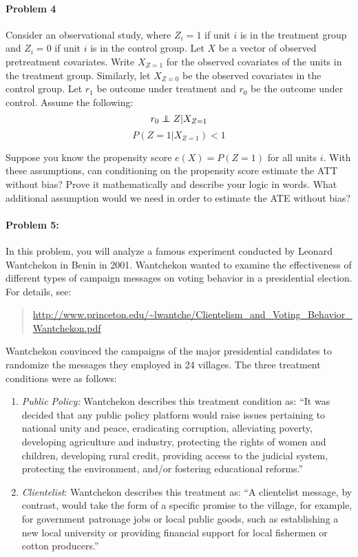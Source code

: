 \documentclass{article}
\newcommand\independent{\protect\mathpalette{\protect\independenT}{\perp}}
\def\independenT#1#2{\mathrel{\rlap{$#1#2$}\mkern2mu{#1#2}}}
\begin{document}
\paragraph{Problem 4}
Consider an observational study, where $Z_i=1$ if unit $i$ is in the treatment group and
$Z_i=0$ if unit $i$ is in  the control group. Let $X$ be
a vector of observed pretreatment covariates. Write
$X_{Z=1}$ for the observed covariates of the units in the
treatment group. Similarly, let $X_{Z=0}$ be the observed
covariates in the control group.  Let $r_{1}$ be outcome under treatment
and $r_{0}$ be the outcome under control.  Assume the following:
$$r_0 \independent Z|X_{Z=1}$$
$$ P(Z=1|X_{Z=1})<1$$

\noindent Suppose you know the propensity score $e(X)=P(Z=1)$ for all
units $i$.  With these assumptions, can conditioning on the propensity
score estimate the ATT without bias? Prove it mathematically and
describe your logic in words.  What additional assumption would we
need in order to estimate the ATE without bias? 




\paragraph{Problem 5:}
In this problem, you will analyze a famous experiment conducted by Leonard Wantchekon in Benin in 2001. Wantchekon wanted to examine the effectiveness of different types of campaign messages on voting behavior in a presidential election.
For details, see:
\begin{quote}
  \url{http://www.princeton.edu/~lwantche/Clientelism_and_Voting_Behavior_Wantchekon.pdf}
\end{quote}

 Wantchekon convinced the campaigns of the major presidential candidates to randomize the messages they employed in 24 villages. The three treatment conditions were as follows: 
\begin{enumerate}
\item \textit{Public Policy:} Wantchekon describes this treatment condition as: ``It was decided that any public policy platform would raise issues pertaining to national unity and peace, eradicating corruption, alleviating poverty, developing agriculture and industry, protecting the rights of women and children, developing rural credit, providing access to the judicial system, protecting the environment, and/or fostering educational reforms.''
\item \textit{Clientelist}: Wantchekon describes this treatment as: ``A clientelist message, by contrast, would take the form of a specific promise to the village, for example, for government patronage jobs or local public goods, such as establishing a new local university or providing financial support for local fishermen or cotton producers.''
\end{enumerate}
\end{document}
